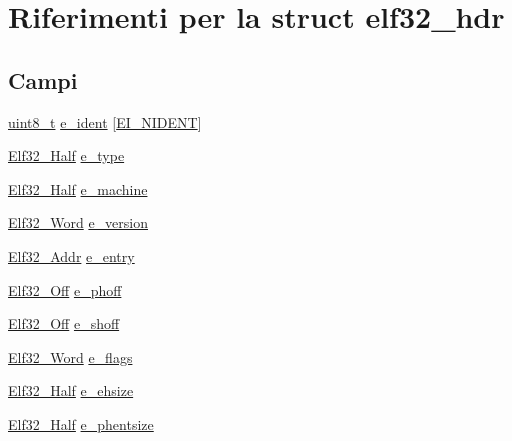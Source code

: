 \hypertarget{structelf32__hdr}{\section{Riferimenti per la struct elf32\+\_\+hdr}
\label{structelf32__hdr}
}
\subsection*{Campi}
\begin{DoxyCompactItemize}
\item 
\hyperlink{aplus_8h_ae0430369c5a35dcdbc0bc19dcbb33a03}{uint8\+\_\+t} \hyperlink{structelf32__hdr_a47cad02c87b35eab4d8fda5f3f0fefd4}{e\+\_\+ident} \mbox{[}\hyperlink{exec_8c_ae407130db14180c6737390604ba7c1fe}{E\+I\+\_\+\+N\+I\+D\+E\+N\+T}\mbox{]}
\item 
\hyperlink{exec_8c_a2ff0787d7d1bae0f251192806a2974ca}{Elf32\+\_\+\+Half} \hyperlink{structelf32__hdr_a01aab87d9a8f658d41a1162158c07878}{e\+\_\+type}
\item 
\hyperlink{exec_8c_a2ff0787d7d1bae0f251192806a2974ca}{Elf32\+\_\+\+Half} \hyperlink{structelf32__hdr_ac683164e0380f6babe3f46a3a1ffdfe9}{e\+\_\+machine}
\item 
\hyperlink{exec_8c_af5924ece606c732e86f8263a19408e45}{Elf32\+\_\+\+Word} \hyperlink{structelf32__hdr_a4324ae029dfd1967979b984a2f3e14e4}{e\+\_\+version}
\item 
\hyperlink{exec_8c_a40c6d4571e6001f443cc6a6474620158}{Elf32\+\_\+\+Addr} \hyperlink{structelf32__hdr_aebf266c7454956ac9aca091c837f6c14}{e\+\_\+entry}
\item 
\hyperlink{exec_8c_a655751f9b317369b93c581ea8ed84516}{Elf32\+\_\+\+Off} \hyperlink{structelf32__hdr_a88337612d820200d75185c304124ad24}{e\+\_\+phoff}
\item 
\hyperlink{exec_8c_a655751f9b317369b93c581ea8ed84516}{Elf32\+\_\+\+Off} \hyperlink{structelf32__hdr_afd8ce4ec0f05960b2306f98625be6db0}{e\+\_\+shoff}
\item 
\hyperlink{exec_8c_af5924ece606c732e86f8263a19408e45}{Elf32\+\_\+\+Word} \hyperlink{structelf32__hdr_a8695845266a8825d6cc9c04205c783f5}{e\+\_\+flags}
\item 
\hyperlink{exec_8c_a2ff0787d7d1bae0f251192806a2974ca}{Elf32\+\_\+\+Half} \hyperlink{structelf32__hdr_a3d3364b74b882c7383f11a17ddda34b2}{e\+\_\+ehsize}
\item 
\hyperlink{exec_8c_a2ff0787d7d1bae0f251192806a2974ca}{Elf32\+\_\+\+Half} \hyperlink{structelf32__hdr_a7c8f7ea4bb2789905be6dc875c1e502d}{e\+\_\+phentsize}

\end{DoxyCompactItemize}
